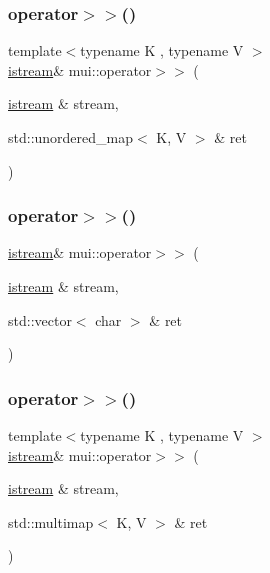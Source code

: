 \subsubsection{\texorpdfstring{operator$>$$>$()}{operator>>()}\hspace{0.1cm}{\footnotesize\ttfamily [4/20]}}
{\footnotesize\ttfamily template$<$typename K , typename V $>$ \\
\hyperlink{classmui_1_1istream}{istream}\& mui\+::operator$>$$>$ (\begin{DoxyParamCaption}\item[{\hyperlink{classmui_1_1istream}{istream} \&}]{stream,  }\item[{std\+::unordered\+\_\+map$<$ K, V $>$ \&}]{ret }\end{DoxyParamCaption})\hspace{0.3cm}{\ttfamily [inline]}}

\mbox{\label{namespacemui_a8fbed71bb535994e689dc3c283556ffb}} 
\subsubsection{\texorpdfstring{operator$>$$>$()}{operator>>()}\hspace{0.1cm}{\footnotesize\ttfamily [5/20]}}
{\footnotesize\ttfamily \hyperlink{classmui_1_1istream}{istream}\& mui\+::operator$>$$>$ (\begin{DoxyParamCaption}\item[{\hyperlink{classmui_1_1istream}{istream} \&}]{stream,  }\item[{std\+::vector$<$ char $>$ \&}]{ret }\end{DoxyParamCaption})\hspace{0.3cm}{\ttfamily [inline]}}

\mbox{\label{namespacemui_a2f8b4027a1269872ecb719ab51f72f54}} 
\subsubsection{\texorpdfstring{operator$>$$>$()}{operator>>()}\hspace{0.1cm}{\footnotesize\ttfamily [6/20]}}
{\footnotesize\ttfamily template$<$typename K , typename V $>$ \\
\hyperlink{classmui_1_1istream}{istream}\& mui\+::operator$>$$>$ (\begin{DoxyParamCaption}\item[{\hyperlink{classmui_1_1istream}{istream} \&}]{stream,  }\item[{std\+::multimap$<$ K, V $>$ \&}]{ret }\end{DoxyParamCaption})\hspace{0.3cm}{\ttfamily [inline]}}

